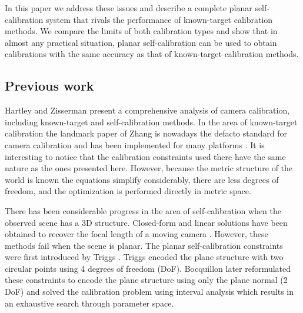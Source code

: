 \documentclass[10pt,twocolumn,letterpaper]{article}
\begin{document}
In this paper we address these issues and describe a complete planar self-calibration system that rivals the performance of known-target calibration methods. We compare the limits of both calibration types and show that in almost any practical situation, planar self-calibration can be used to obtain calibrations with the same accuracy as that of known-target calibration methods.


\subsection*{Previous work}

Hartley and Zisserman \cite{hartley2003} present a comprehensive analysis of camera calibration, including known-target and self-calibration methods. In the area of known-target calibration the landmark paper of Zhang \cite{zhang1999} is nowadays the defacto standard for camera calibration and has been implemented for many platforms \cite{bouguetMCT,opencv_library}. It is interesting to notice that the calibration constraints used there have the same nature as the ones presented here. However, because the metric structure of the world is known the equations simplify considerably, there are less degrees of freedom, and the optimization is performed directly in metric space. 

There has been considerable progress in the area of self-calibration when the observed scene has a 3D structure. Closed-form and linear solutions have been obtained to recover the focal length of a moving camera \cite{bougnoux1998}. However, these methods fail when the scene is planar. The planar self-calibration constraints were first introduced by Triggs \cite{triggs1998}. Triggs encoded the plane structure with two circular points using 4 degrees of freedom (DoF). Bocquillon \etal \cite{bocquillon2006} later reformulated these constraints to encode the plane structure using only the plane normal (2 DoF) and solved the calibration problem using interval analysis which results in an exhaustive search through parameter space.
\end{document}
